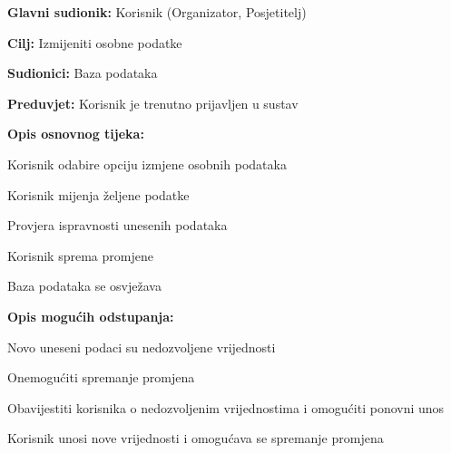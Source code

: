 					
					\noindent {}
					\begin{packed_item}
						
						\item \textbf{Glavni sudionik: } Korisnik (Organizator, Posjetitelj)
						\item  \textbf{Cilj:} Izmijeniti osobne podatke 
						\item  \textbf{Sudionici:} Baza podataka
						\item  \textbf{Preduvjet:} Korisnik je trenutno prijavljen u sustav
						\item  \textbf{Opis osnovnog tijeka:}
						
						\item[] \begin{packed_enum}
							
							\item Korisnik odabire opciju izmjene osobnih podataka
							\item Korisnik mijenja željene podatke 
							\item Provjera ispravnosti unesenih podataka 
							\item Korisnik sprema promjene
							\item Baza podataka se osvježava 
							
						\end{packed_enum}
						
						\item  \textbf{Opis mogućih odstupanja:}
						
						\item[] \begin{packed_item}
							
							\item[2.a] Novo uneseni podaci su nedozvoljene vrijednosti
							\item[] \begin{packed_enum}
								
								\item Onemogućiti spremanje promjena
								\item Obavijestiti korisnika o nedozvoljenim vrijednostima i omogućiti ponovni unos 
								\item Korisnik unosi nove vrijednosti i omogućava se spremanje promjena
								
							\end{packed_enum}
							

\end{packed_item}
\end{packed_item}
